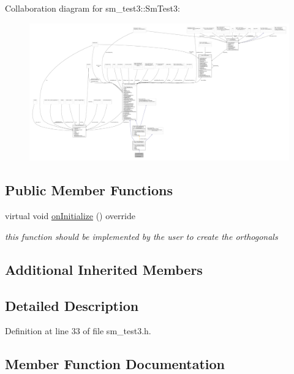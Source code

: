 Collaboration diagram for sm\+\_\+test3\+:\+:Sm\+Test3\+:
\nopagebreak
\begin{figure}[H]
\begin{center}
\leavevmode
\includegraphics[width=350pt]{structsm__test3_1_1SmTest3__coll__graph}
\end{center}
\end{figure}
\subsection*{Public Member Functions}
\begin{DoxyCompactItemize}
\item 
virtual void \hyperlink{structsm__test3_1_1SmTest3_a7bf3032514e07382732cff424ddc21cf}{on\+Initialize} () override
\begin{DoxyCompactList}\small\item\em this function should be implemented by the user to create the orthogonals \end{DoxyCompactList}\end{DoxyCompactItemize}
\subsection*{Additional Inherited Members}


\subsection{Detailed Description}


Definition at line 33 of file sm\+\_\+test3.\+h.



\subsection{Member Function Documentation}
\mbox{\label{structsm__test3_1_1SmTest3_a7bf3032514e07382732cff424ddc21cf}} 
